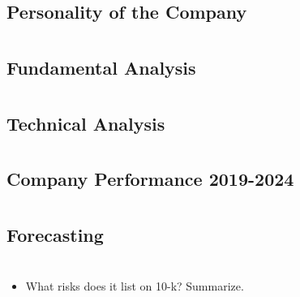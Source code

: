 \documentclass[
  letterpaper,
  DIV=11,
  numbers=noendperiod]{scrartcl}
\providecommand{\tightlist}{%
  \setlength{\itemsep}{0pt}\setlength{\parskip}{0pt}}\usepackage{longtable,booktabs,array}
\begin{document}
\subsection{Personality of the
Company}\label{personality-of-the-company}

\section{}\label{section-2}

\subsection{Fundamental Analysis}\label{fundamental-analysis}

\section{}\label{section-3}

\subsection{Technical Analysis}\label{technical-analysis}

\section{}\label{section-4}

\subsection{Company Performance
2019-2024}\label{company-performance-2019-2024}

\section{}\label{section-5}

\subsection{Forecasting}\label{forecasting}

\section{}\label{section-6}

\begin{itemize}
\tightlist
\item
  What risks does it list on 10-k? Summarize.
\end{itemize}
\end{document}

